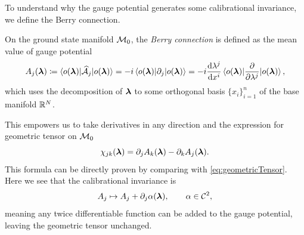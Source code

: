 To understand why the gauge potential generates some calibrational invariance, we define the Berry connection.
\begin{definition}    
    On the ground state manifold $\mathcal{M}_0$, the \emph{Berry connection} is defined as the mean value of gauge potential
    \begin{equation}
        A_j({\bm\lambda})\coloneqq \braket{o({\bm\lambda})|\mathcal{\widehat{A}}_j|o({\bm\lambda})}= -i \braket{o({\bm\lambda})|\partial_j|o({\bm\lambda})}= -i\frac{\mathrm{d} \lambda^j}{\mathrm{d} x^i} \braket{o({\bm\lambda})|\frac{\partial }{\partial \lambda^j}|o({\bm\lambda})},
        \label{eq:berryConnection}
    \end{equation}
    which uses the decomposition of ${\bm\lambda}$ to some orthogonal basis $\{x_i\}_{i=1}^n$ of the base manifold $\mathbb{R}^N$. 
\end{definition}
    

This empowers us to take derivatives in any direction and the expression for geometric tensor on $\mathcal{M}_0$
\begin{equation}
    \chi_{jk}({\bm\lambda}) = \partial_j A_k({\bm\lambda})-\partial_k A_j({\bm\lambda})
    \label{eq:geometricTensor}.
\end{equation}
This formula can be directly proven by comparing with \ref{eq:geometricTensor}. Here we see that the calibrational invariance is 
\begin{equation}
    A_j \mapsto A_j+\partial_j \alpha({\bm\lambda}),\qquad \alpha\in\mathcal C^2,
\end{equation}
meaning any twice differentiable function can be added to the gauge potential, leaving the geometric tensor unchanged.

